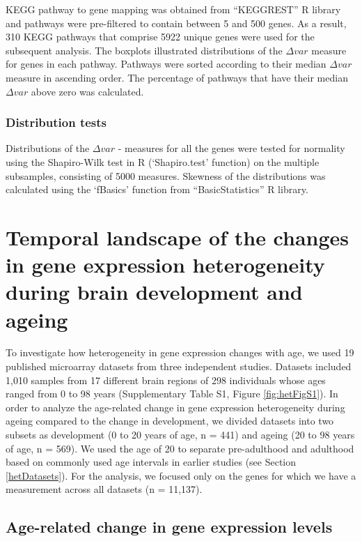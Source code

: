 \documentclass[12pt,twoside]{unicam}
\begin{document}
KEGG pathway to gene mapping was obtained from ``KEGGREST'' R library and pathways were pre-filtered to contain between 5 and 500 genes. As a result, 310 KEGG pathways that comprise 5922 unique genes were used for the subsequent analysis. The boxplots illustrated distributions of the \(\Delta var\) measure for genes in each pathway. Pathways were sorted according to their median \(\Delta var\) measure in ascending order. The percentage of pathways that have their median \(\Delta var\) above zero was calculated.

\hypertarget{distribution-tests}{%
\subsubsection{Distribution tests}\label{distribution-tests}}

Distributions of the \(\Delta var\) - measures for all the genes were tested for normality using the Shapiro-Wilk test in R (`Shapiro.test' function) on the multiple subsamples, consisting of 5000 measures. Skewness of the distributions was calculated using the `fBasics' function from ``BasicStatistics'' R library.

\hypertarget{ulasresults}{%
\section{Temporal landscape of the changes in gene expression heterogeneity during brain development and ageing}\label{ulasresults}}

To investigate how heterogeneity in gene expression changes with age, we used 19 published microarray datasets from three independent studies. Datasets included 1,010 samples from 17 different brain regions of 298 individuals whose ages ranged from 0 to 98 years (Supplementary Table S1, Figure \ref{fig:hetFigS1}). In order to analyze the age-related change in gene expression heterogeneity during ageing compared to the change in development, we divided datasets into two subsets as development (0 to 20 years of age, n = 441) and ageing (20 to 98 years of age, n = 569). We used the age of 20 to separate pre-adulthood and adulthood based on commonly used age intervals in earlier studies (see Section \ref{hetDatasets}). For the analysis, we focused only on the genes for which we have a measurement across all datasets (n = 11,137).

\hypertarget{age-related-change-in-gene-expression-levels}{%
\subsection{Age-related change in gene expression levels}\label{age-related-change-in-gene-expression-levels}}
\end{document}
